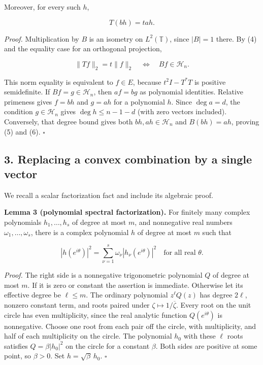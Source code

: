 \documentclass[10pt,a4paper]{article}
\begin{document}
Moreover, for every such \(h\),

\nopagebreak[4]

\[
T(bh)=tah.
\tag{6}
\]

\emph{Proof.} Multiplication by \(B\) is an isometry on
\(L^2(\mathbb T)\), since \(|B|=1\) there. By (4) and the equality case
for an orthogonal projection,

\nopagebreak[4]

\[
\|Tf\|_2=t\|f\|_2
\quad\Longleftrightarrow\quad Bf\in\mathcal H_n.
\]

This norm equality is equivalent to \(f\in E\), because \(t^2I-T^*T\) is
positive semidefinite. If \(Bf=g\in\mathcal H_n\), then \(af=bg\) as
polynomial identities. Relative primeness gives \(f=bh\) and \(g=ah\)
for a polynomial \(h\). Since \(\deg a=d\), the condition
\(g\in\mathcal H_n\) gives \(\deg h\le n-1-d\) (with zero vectors
included). Conversely, that degree bound gives both
\(bh,ah\in\mathcal H_n\) and \(B(bh)=ah\), proving (5) and (6).
\(\square\)

\subsection{3. Replacing a convex combination by a single
vector}\label{replacing-a-convex-combination-by-a-single-vector}

We recall a scalar factorization fact and include its algebraic proof.

\textbf{Lemma 3 (polynomial spectral factorization).} For finitely many
complex polynomials \(h_1,\ldots,h_s\) of degree at most \(m\), and
nonnegative real numbers \(\omega_1,\ldots,\omega_s\), there is a
complex polynomial \(h\) of degree at most \(m\) such that

\nopagebreak[4]

\[
|h(e^{i\theta})|^2
=\sum_{\nu=1}^{s}\omega_\nu |h_\nu(e^{i\theta})|^2
\quad\text{for all real }\theta.
\tag{7}
\]

\emph{Proof.} The right side is a nonnegative trigonometric polynomial
\(Q\) of degree at most \(m\). If it is zero or constant the assertion
is immediate. Otherwise let its effective degree be \(\ell\le m\). The
ordinary polynomial \(z^\ell Q(z)\) has degree \(2\ell\), nonzero
constant term, and roots paired under \(\zeta\mapsto1/\overline\zeta\).
Every root on the unit circle has even multiplicity, since the real
analytic function \(Q(e^{i\theta})\) is nonnegative. Choose one root
from each pair off the circle, with multiplicity, and half of each
multiplicity on the circle. The polynomial \(h_0\) with these \(\ell\)
roots satisfies \(Q=\beta|h_0|^2\) on the circle for a constant
\(\beta\). Both sides are positive at some point, so \(\beta>0\). Set
\(h=\sqrt\beta\,h_0\). \(\square\)
\end{document}
